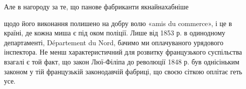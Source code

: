 Але в нагороду за те, що панове фабриканти якнайнахабніше

щодо його виконання полишено на добру волю «amis du commerce», і це
в країні, де кожна миша є під оком поліції. Лише від 1853 р. в одинодному
департаменті, Département du Nord, бачимо ми оплачуваного урядового
інспектора. Не менш характеристичний для розвитку французького
суспільства взагалі є той факт, що закон Люї-Філіпа до революції 1848 р.
був однісіньким законом у тій французькій законодавчій фабриці, що
своєю сіткою оплітає геть усе.
\parbreak{}  %
